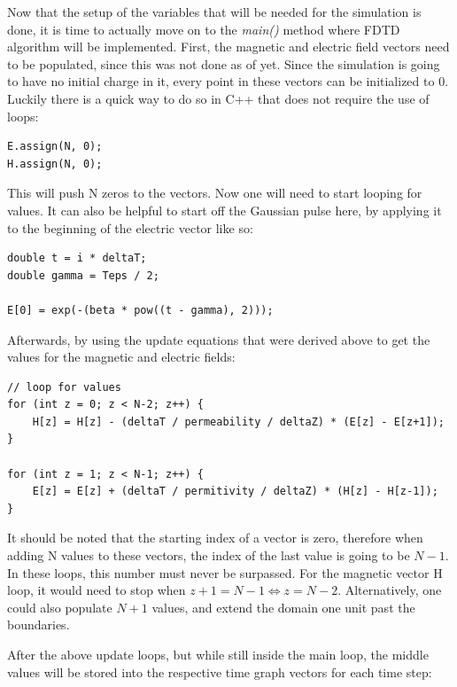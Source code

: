Now that the setup of the variables that will be needed for the simulation is done, it is time to actually move on to the \textit{main()} method where FDTD algorithm will be implemented. First, the magnetic and electric field vectors need to be populated, since this was not done as of yet. Since the simulation is going to have no initial charge in it, every point in these vectors can be initialized to $0$. Luckily there is a quick way to do so in C++ that does not require the use of loops:

\begin{verbatim}
E.assign(N, 0);
H.assign(N, 0);
\end{verbatim}

This will push N zeros to the vectors. Now one will need to start looping for  values. It can also be helpful to start off the Gaussian pulse here, by applying it to the beginning of the electric vector like so:

\begin{verbatim}
double t = i * deltaT;
double gamma = Teps / 2;

E[0] = exp(-(beta * pow((t - gamma), 2)));
\end{verbatim}

Afterwards, by using the update equations that were derived above to get the values for the magnetic and electric fields:

\begin{verbatim}
// loop for values
for (int z = 0; z < N-2; z++) {
	H[z] = H[z] - (deltaT / permeability / deltaZ) * (E[z] - E[z+1]);
}

for (int z = 1; z < N-1; z++) {
	E[z] = E[z] + (deltaT / permitivity / deltaZ) * (H[z] - H[z-1]);
}
\end{verbatim}

It should be noted that the starting index of a vector is zero, therefore when adding N values to these vectors, the index of the last value is going to be $N-1$. In these loops, this number must never be surpassed. For the magnetic vector H loop, it would need to stop when $z + 1 = N - 1 \Leftrightarrow z = N - 2$. Alternatively, one could also populate $N + 1$ values, and extend the domain one unit past the boundaries.

After the above update loops, but while still inside the main loop, the middle values will be stored into the respective time graph vectors for each time step:

